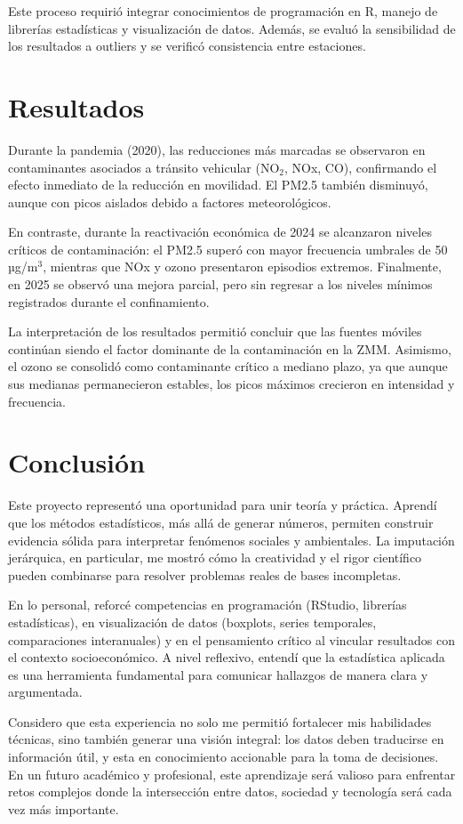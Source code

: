 \documentclass[12pt]{article}
\begin{document}
Este proceso requirió integrar conocimientos de programación en R, manejo de librerías estadísticas y visualización de datos. Además, se evaluó la sensibilidad de los resultados a outliers y se verificó consistencia entre estaciones.

\section*{Resultados}
Durante la pandemia (2020), las reducciones más marcadas se observaron en contaminantes asociados a tránsito vehicular (NO$_2$, NOx, CO), confirmando el efecto inmediato de la reducción en movilidad. El PM2.5 también disminuyó, aunque con picos aislados debido a factores meteorológicos.

En contraste, durante la reactivación económica de 2024 se alcanzaron niveles críticos de contaminación: el PM2.5 superó con mayor frecuencia umbrales de 50 µg/m$^3$, mientras que NOx y ozono presentaron episodios extremos. Finalmente, en 2025 se observó una mejora parcial, pero sin regresar a los niveles mínimos registrados durante el confinamiento.

La interpretación de los resultados permitió concluir que las fuentes móviles continúan siendo el factor dominante de la contaminación en la ZMM. Asimismo, el ozono se consolidó como contaminante crítico a mediano plazo, ya que aunque sus medianas permanecieron estables, los picos máximos crecieron en intensidad y frecuencia.

\section*{Conclusión}
Este proyecto representó una oportunidad para unir teoría y práctica. Aprendí que los métodos estadísticos, más allá de generar números, permiten construir evidencia sólida para interpretar fenómenos sociales y ambientales. La imputación jerárquica, en particular, me mostró cómo la creatividad y el rigor científico pueden combinarse para resolver problemas reales de bases incompletas.

En lo personal, reforcé competencias en programación (RStudio, librerías estadísticas), en visualización de datos (boxplots, series temporales, comparaciones interanuales) y en el pensamiento crítico al vincular resultados con el contexto socioeconómico. A nivel reflexivo, entendí que la estadística aplicada es una herramienta fundamental para comunicar hallazgos de manera clara y argumentada.

Considero que esta experiencia no solo me permitió fortalecer mis habilidades técnicas, sino también generar una visión integral: los datos deben traducirse en información útil, y esta en conocimiento accionable para la toma de decisiones. En un futuro académico y profesional, este aprendizaje será valioso para enfrentar retos complejos donde la intersección entre datos, sociedad y tecnología será cada vez más importante.
\end{document}
